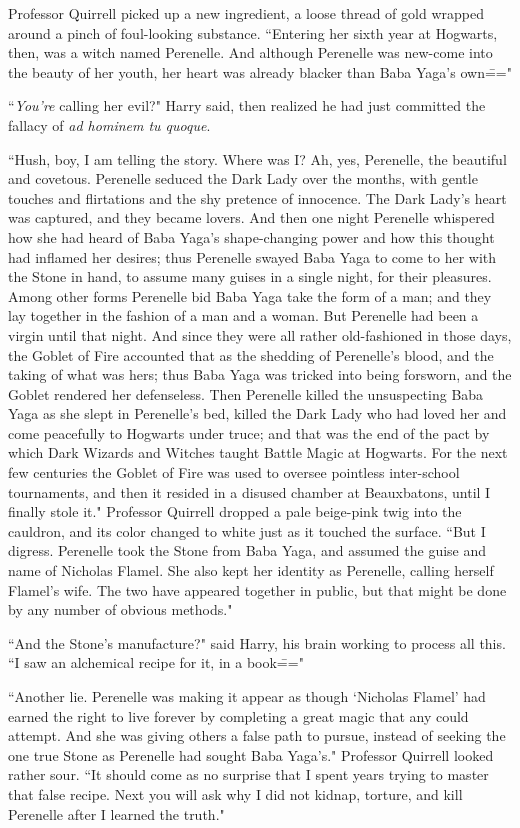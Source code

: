 Professor Quirrell picked up a new ingredient, a loose thread of gold wrapped around a pinch of foul-looking substance. ``Entering her sixth year at Hogwarts, then, was a witch named Perenelle. And although Perenelle was new-come into the beauty of her youth, her heart was already blacker than Baba Yaga's own\==="

``\emph{You're} calling her evil?" Harry said, then realized he had just committed the fallacy of \emph{ad hominem tu quoque}.

``Hush, boy, I am telling the story. Where was I? Ah, yes, Perenelle, the beautiful and covetous. Perenelle seduced the Dark Lady over the months, with gentle touches and flirtations and the shy pretence of innocence. The Dark Lady's heart was captured, and they became lovers. And then one night Perenelle whispered how she had heard of Baba Yaga's shape-changing power and how this thought had inflamed her desires; thus Perenelle swayed Baba Yaga to come to her with the Stone in hand, to assume many guises in a single night, for their pleasures. Among other forms Perenelle bid Baba Yaga take the form of a man; and they lay together in the fashion of a man and a woman. But Perenelle had been a virgin until that night. And since they were all rather old-fashioned in those days, the Goblet of Fire accounted that as the shedding of Perenelle's blood, and the taking of what was hers; thus Baba Yaga was tricked into being forsworn, and the Goblet rendered her defenseless. Then Perenelle killed the unsuspecting Baba Yaga as she slept in Perenelle's bed, killed the Dark Lady who had loved her and come peacefully to Hogwarts under truce; and that was the end of the pact by which Dark Wizards and Witches taught Battle Magic at Hogwarts. For the next few centuries the Goblet of Fire was used to oversee pointless inter-school tournaments, and then it resided in a disused chamber at Beauxbatons, until I finally stole it." Professor Quirrell dropped a pale beige-pink twig into the cauldron, and its color changed to white just as it touched the surface. ``But I digress. Perenelle took the Stone from Baba Yaga, and assumed the guise and name of Nicholas Flamel. She also kept her identity as Perenelle, calling herself Flamel's wife. The two have appeared together in public, but that might be done by any number of obvious methods."

``And the Stone's manufacture?" said Harry, his brain working to process all this. ``I saw an alchemical recipe for it, in a book\==="

``Another lie. Perenelle was making it appear as though `Nicholas Flamel' had earned the right to live forever by completing a great magic that any could attempt. And she was giving others a false path to pursue, instead of seeking the one true Stone as Perenelle had sought Baba Yaga's." Professor Quirrell looked rather sour. ``It should come as no surprise that I spent years trying to master that false recipe. Next you will ask why I did not kidnap, torture, and kill Perenelle after I learned the truth."


